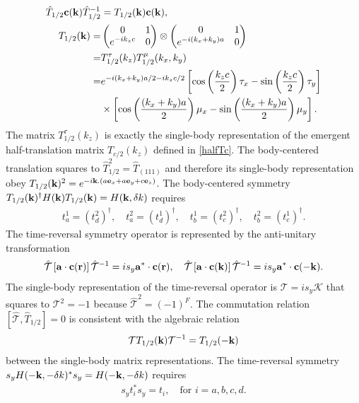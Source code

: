 \begin{align}
\hat{T}_{1/2}{\bf c}({\bf k})\hat{T}_{1/2}^{-1}&=T_{1/2}({\bf k}){\bf c}({\bf k}),\\
T_{1/2}({\bf k})=&
\begin{pmatrix}
0&1\\
e^{-ik_zc}&0
\end{pmatrix}
\otimes
\begin{pmatrix}
0&1\\
e^{-i(k_x+k_y)a}&0
\end{pmatrix}\\
=&T_{1/2}^\tau(k_z)T_{1/2}^\mu(k_x,k_y)\nonumber\\
=&e^{-i(k_x+k_y)a/2-ik_zc/2}\left[\cos\left(\frac{k_zc}{2}\right)\tau_x-\sin\left(\frac{k_zc}{2}\right)\tau_y\right]\\
&\times\left[\cos\left(\frac{(k_x+k_y)a}{2}\right)\mu_x-\sin\left(\frac{(k_x+k_y)a}{2}\right)\mu_y\right].\nonumber\end{align} The matrix $T_{1/2}^\tau(k_z)$ is exactly the single-body representation of the emergent half-translation matrix $T_{c/2}(k_z)$ defined in \eqref{halfTc}. The body-centered translation squares to $\hat{T}_{1/2}^2=\hat{T}_{(111)}$ and therefore its single-body representation obey $T_{1/2}({\bf k})^2=e^{-i{\bf k}.(a{\bf e}_x+a{\bf e}_y+c{\bf e}_z)}$. The body-centered symmetry $T_{1/2}({\bf k})^\dagger H({\bf k})T_{1/2}({\bf k})=H({\bf k},\delta k)$ requires \begin{gather}%
t_a^1=(t_d^2)^\dagger,\quad t_a^2=(t_d^1)^\dagger,\quad t_b^1=(t_c^2)^\dagger,\quad t_b^2=(t_c^1)^\dagger.\label{BCsymm}\end{gather} The time-reversal symmetry operator is represented by the anti-unitary transformation \begin{align}\hat{\mathcal{T}}\left[{\bf a}\cdot{\bf c}({\bf r})\right]\hat{\mathcal{T}}^{-1}=is_y{\bf a}^\ast\cdot{\bf c}({\bf r}),\quad\hat{\mathcal{T}}\left[{\bf a}\cdot{\bf c}({\bf k})\right]\hat{\mathcal{T}}^{-1}=is_y{\bf a}^\ast\cdot{\bf c}(-{\bf k}).\end{align} The single-body representation of the time-reversal operator is $\mathcal{T}=is_y\mathcal{K}$ that squares to $\mathcal{T}^2=-1$ because $\hat{\mathcal{T}}^2=(-1)^F$. The commutation relation $[\hat{\mathcal{T}},\hat{T}_{1/2}]=0$ is consistent with the algebraic relation \begin{align}\mathcal{T}T_{1/2}({\bf k})\mathcal{T}^{-1}=T_{1/2}(-{\bf k})\end{align} between the single-body matrix representations. The time-reversal symmetry $s_yH(-{\bf k},-\delta k)^\ast s_y=H(-{\bf k},-\delta k)$ requires \begin{align}s_yt_i^\ast s_y=t_i,\quad\mbox{for $i=a,b,c,d$}.\label{TRsymm}\end{align} 

